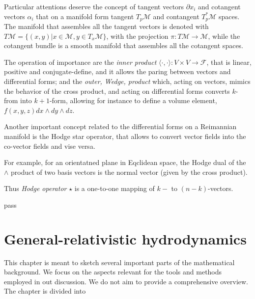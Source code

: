 {    Particular attentions deserve the concept of tangent vectors $\partial x_i$ and cotangent vectors $\alpha_i$ that on a manifold form tangent $T_p \mathcal{M}$ and contangent $T_p^*\mathcal{M}$ spaces. The manifold that assembles all the tangent vectors is denoted with $T\mathcal{M} = \{ (x,y) | x\in \mathcal{M}, y \in T_x \mathcal{M} \}$, with the projection $\pi:T\mathcal{M}\rightarrow \mathcal{M}$, while the cotangent bundle is a smooth manifold that assembles all the cotangent spaces.
    
    The operation of importance are the \textit{inner product} $\langle \cdot,\cdot \rangle : V \times V \rightarrow \mathcal{F}$, that is linear, positive and conjugate-define, and it allows the paring between vectors and differential forms; 
    and the \textit{outer, Wedge, product} which, acting on vectors, mimics the behavior of the cross product, and acting on differential forms converts $k$-from into $k+1$-form, allowing for instance to define a volume element, $f(x,y,z)dx \wedge dy \wedge dz$. 
    
    Another important concept related to the differential forms on a Reimannian manifold is the Hodge star operator, that allows to convert vector fields into the co-vector fields and vise versa.
    
    For example, for an orientatned plane in Eqclidean space,
    the Hodge dual of the $\wedge$ product of two basis vectors is the normal vector (given by the cross product).

    Thus \textit{Hodge operator} $\star$ is a one-to-one mapping of $k-$ to $(n-k)$-vectors.
    
}{
    pass
}


\section{General-relativistic hydrodynamics}



This chapter is meant to sketch several important parts of the mathematical background. We focus on the aspects relevant for the tools and methods employed in out discussion. 
We do not aim to provide a comprehensive overview. 
The chapter is divided into 

